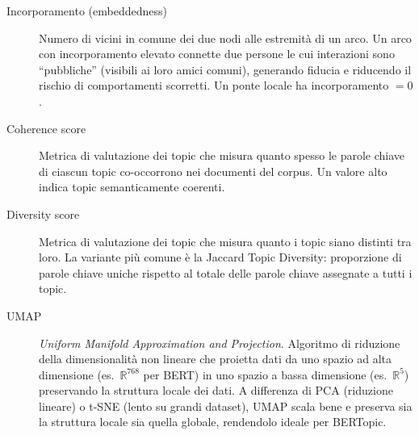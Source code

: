 \documentclass[12pt,a4paper]{article}
\begin{document}
\begin{description}
  \item[Incorporamento (embeddedness)] Numero di vicini in comune dei due nodi alle
  estremità di un arco. Un arco con incorporamento elevato connette due persone le cui
  interazioni sono ``pubbliche'' (visibili ai loro amici comuni), generando fiducia e
  riducendo il rischio di comportamenti scorretti. Un ponte locale ha incorporamento $= 0$.

  \item[Coherence score] Metrica di valutazione dei topic che misura quanto spesso le
  parole chiave di ciascun topic co-occorrono nei documenti del corpus. Un valore alto
  indica topic semanticamente coerenti.

  \item[Diversity score] Metrica di valutazione dei topic che misura quanto i topic siano
  distinti tra loro. La variante più comune è la Jaccard Topic Diversity: proporzione di
  parole chiave uniche rispetto al totale delle parole chiave assegnate a tutti i topic.

  \item[UMAP] \textit{Uniform Manifold Approximation and Projection}. Algoritmo di
  riduzione della dimensionalità non lineare che proietta dati da uno spazio ad alta
  dimensione (es.\ $\mathbb{R}^{768}$ per BERT) in uno spazio a bassa dimensione
  (es.\ $\mathbb{R}^5$) preservando la struttura locale dei dati. A differenza di PCA
  (riduzione lineare) o t-SNE (lento su grandi dataset), UMAP scala bene e preserva
  sia la struttura locale sia quella globale, rendendolo ideale per BERTopic.

\end{description}
\end{document}
